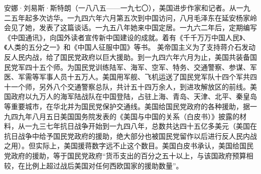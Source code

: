 \begin{maonote}
安娜·刘易斯·斯特朗（一八八五——一九七〇），美国进步作家和记者。从一九二五年起多次访华。一九四六年六月第五次到中国访问，八月毛泽东在延安杨家岭会见了她，发表了这篇谈话。一九五八年她来中国定居。一九六二年后，定期编写《中国通讯》，向国外读者宣传新中国建设的成就。着有《千千万万中国人民》、《人类的五分之一》和《中国人征服中国》等书。
美帝国主义为了支持蒋介石发动反人民内战，给了国民党政府以巨大援助。到一九四六年六月为止，美国共装备国民党军四十五个师。为国民党训练陆军、海军、空军、特务、交通警察、参谋、军医、军需等军事人员十五万人。美国用军舰、飞机运送了国民党军队十四个军共四十一个师，另外八个交通警察总队，共计五十四万余人，到进攻解放区的前线。美国政府以九万人的海军陆战队在中国登陆，占驻上海、青岛、天津、北平、秦皇岛等重要城市，在华北并为国民党保护交通线。美国给国民党政府的各种援助，据一九四九年八月五日美国国务院发表的《美国与中国的关系（白皮书）》披露的材料，从一九三七年抗日战争开始到一九四八年，总数共达四十五亿多美元（美国在抗日战争中给予国民党政府的援助，绝大部分也被国民党留作以后进行反人民内战之用）。但实际上，美国援蒋数字远不止这个数目。美国白皮书承认，美国给国民党政府的援助，等于国民党政府“货币支出的百分之五十以上，与该国政府预算相较，在比例上超过战后美国对任何西欧国家的援助数量”。
\end{maonote}
